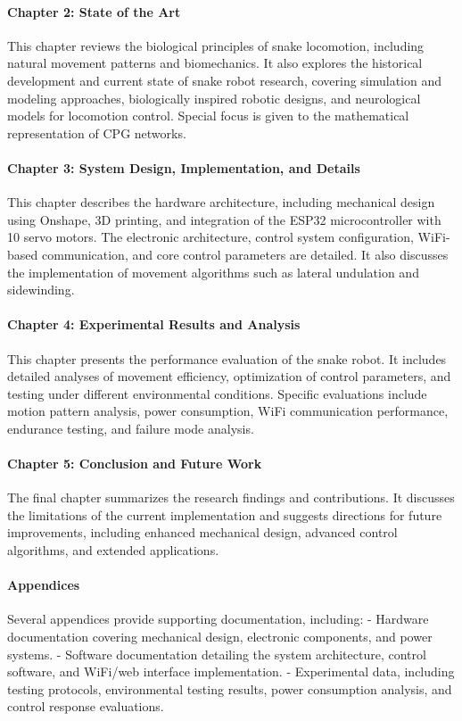 \documentclass[12pt,a4paper]{report}
\begin{document}
\paragraph{Chapter 2: State of the Art} 
This chapter reviews the biological principles of snake locomotion, including natural movement patterns and biomechanics. It also explores the historical development and current state of snake robot research, covering simulation and modeling approaches, biologically inspired robotic designs, and neurological models for locomotion control. Special focus is given to the mathematical representation of CPG networks.

\paragraph{Chapter 3: System Design, Implementation, and Details} 
This chapter describes the hardware architecture, including mechanical design using Onshape, 3D printing, and integration of the ESP32 microcontroller with 10 servo motors. The electronic architecture, control system configuration, WiFi-based communication, and core control parameters are detailed. It also discusses the implementation of movement algorithms such as lateral undulation and sidewinding.

\paragraph{Chapter 4: Experimental Results and Analysis} 
This chapter presents the performance evaluation of the snake robot. It includes detailed analyses of movement efficiency, optimization of control parameters, and testing under different environmental conditions. Specific evaluations include motion pattern analysis, power consumption, WiFi communication performance, endurance testing, and failure mode analysis.

\paragraph{Chapter 5: Conclusion and Future Work} 
The final chapter summarizes the research findings and contributions. It discusses the limitations of the current implementation and suggests directions for future improvements, including enhanced mechanical design, advanced control algorithms, and extended applications.

\paragraph{Appendices} 
Several appendices provide supporting documentation, including:
- Hardware documentation covering mechanical design, electronic components, and power systems.
- Software documentation detailing the system architecture, control software, and WiFi/web interface implementation.
- Experimental data, including testing protocols, environmental testing results, power consumption analysis, and control response evaluations.
\end{document}

